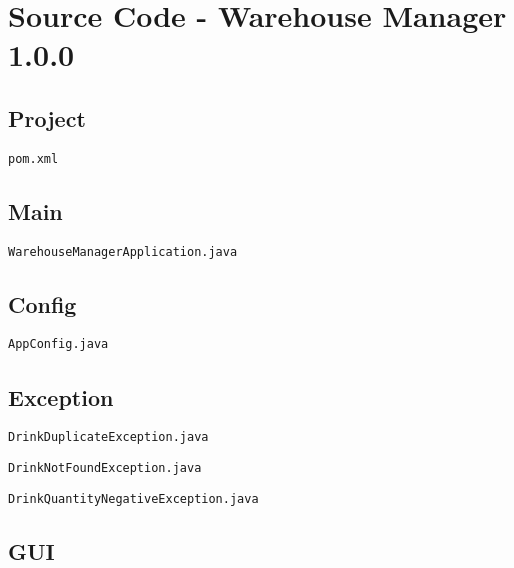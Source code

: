\chapter{Source Code - Warehouse Manager 1.0.0}

\section{Project}

\verb|pom.xml|



\section{Main}

\verb|WarehouseManagerApplication.java|



\section{Config}

\verb|AppConfig.java|



\section{Exception}

\verb|DrinkDuplicateException.java|



\verb|DrinkNotFoundException.java|



\verb|DrinkQuantityNegativeException.java|



\section{GUI}

